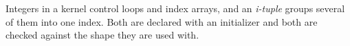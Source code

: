 Integers in a kernel control loops and index arrays, and an \emph{i-tuple} groups several of them into one index. Both are declared with an initializer and both are checked against the shape they are used with.
